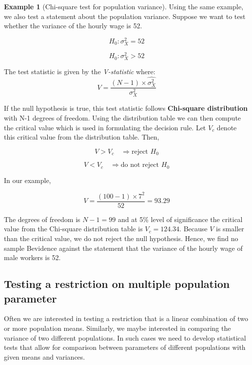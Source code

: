 \documentclass[
]{book}
\theoremstyle{definition}
\theoremstyle{definition}
\newtheorem{example}{Example}[chapter]
\theoremstyle{definition}
\theoremstyle{definition}
\theoremstyle{remark}
\begin{document}
\begin{example}[Chi-square test for population variance]
\protect\hypertarget{exm:unnamed-chunk-49}{}\label{exm:unnamed-chunk-49}Using the same example, we also test a statement about the population variance. Suppose we want to test whether the variance of the hourly wage is 52.

\[H_0: \sigma^2_X=52\]

\[H_0: \sigma^2_X >52 \]

The test statistic is given by the \emph{V-statistic} where:
\[V=\frac{(N-1)\times \hat{\sigma^2_X}}{\sigma^2_X}\]

If the null hypothesis is true, this test statistic follows \textbf{Chi-square distribution} with N-1 degrees of freedom. Using the distribution table we can then compute the critical value which is used in formulating the decision rule. Let \(V_c\) denote this critical value from the distribution table. Then,

\[V>V_c \quad \Rightarrow  \text{reject $H_0$} \]

\[V<V_c \quad \Rightarrow  \text{do not reject $H_0$} \]

In our example,

\[V=\frac{(100-1)\times 7^2}{52}=93.29\]

The degrees of freedom is \(N-1=99\) and at 5\% level of significance the critical value from the Chi-square distribution table is \(V_c=124.34\). Because \(V\) is smaller than the critical value, we do not reject the null hypothesis. Hence, we find no sample Bevidence against the statement that the variance of the hourly wage of male workers is 52.
\end{example}

\hypertarget{testing-a-restriction-on-multiple-population-parameter}{%
\subsection{Testing a restriction on multiple population parameter}\label{testing-a-restriction-on-multiple-population-parameter}}

Often we are interested in testing a restriction that is a linear combination of two or more population means. Similarly, we maybe interested in comparing the variance of two different populations. In such cases we need to develop statistical tests that allow for comparison between parameters of different populations with given means and variances.
\end{document}
